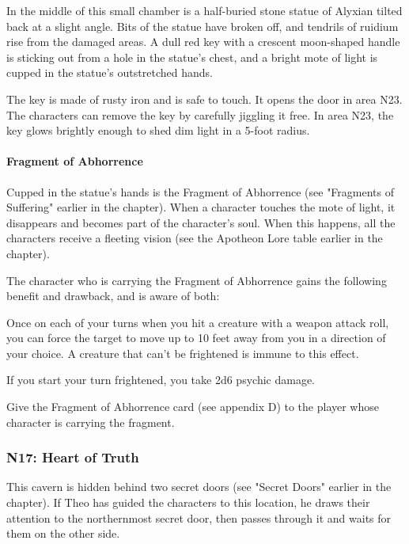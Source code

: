 \documentclass[10pt,a4paper,twoside,bg=print,twocolumn,openany,nodeprecatedcode]{dndbook}
\begin{document}
\begin{DndReadAloud}{}
In the middle of this small chamber is a half-buried stone statue of Alyxian tilted back at a slight angle. Bits of the statue have broken off, and tendrils of ruidium rise from the damaged areas. A dull red key with a crescent moon-shaped handle is sticking out from a hole in the statue's chest, and a bright mote of light is cupped in the statue's outstretched hands.

\end{DndReadAloud}

The key is made of rusty iron and is safe to touch. It opens the door in area N23. The characters can remove the key by carefully jiggling it free. In area N23, the key glows brightly enough to shed dim light in a 5-foot radius.

\paragraph{Fragment of Abhorrence}
Cupped in the statue's hands is the Fragment of Abhorrence (see "Fragments of Suffering" earlier in the chapter). When a character touches the mote of light, it disappears and becomes part of the character's soul. When this happens, all the characters receive a fleeting vision (see the Apotheon Lore table earlier in the chapter).

The character who is carrying the Fragment of Abhorrence gains the following benefit and drawback, and is aware of both:

\begin{DndComment}{}

\begin{description}[nolistsep]
\item[Benefit.]
Once on each of your turns when you hit a creature with a weapon attack roll, you can force the target to move up to 10 feet away from you in a direction of your choice. A creature that can't be frightened is immune to this effect.
\item[Drawback.]
If you start your turn frightened, you take 2d6 psychic damage.
\end{description}

\end{DndComment}

Give the Fragment of Abhorrence card (see appendix D) to the player whose character is carrying the fragment.

\subsubsection{N17: Heart of Truth}
This cavern is hidden behind two secret doors (see "Secret Doors" earlier in the chapter). If Theo has guided the characters to this location, he draws their attention to the northernmost secret door, then passes through it and waits for them on the other side.
\end{document}
